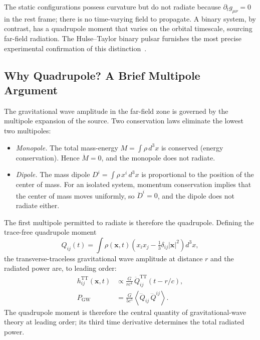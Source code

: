 \documentclass[%
 reprint, amsmath,amssymb, aps, prd, ]{revtex4-2}
\numberwithin{equation}{section}
\begin{document}
The static configurations possess curvature but do not radiate because $\partial_t g_{\mu\nu} = 0$ in the rest frame; there is no time-varying field to propagate.
A binary system, by contrast, has a quadrupole moment that varies on the orbital timescale, sourcing far-field radiation.
The Hulse--Taylor binary pulsar furnishes the most precise experimental confirmation of this distinction~\cite{Hartle2003, Peters1963}.

\subsection{Why Quadrupole? A Brief Multipole Argument}

The gravitational wave amplitude in the far-field zone is governed by the multipole expansion of the source.
Two conservation laws eliminate the lowest two multipoles:
\begin{itemize}[leftmargin=2em, itemsep=4pt]
\item \emph{Monopole.} The total mass-energy $M = \int \rho \, d^3x$ is conserved (energy conservation). Hence $\ddot{M} = 0$, and the monopole does not radiate.
\item \emph{Dipole.} The mass dipole $D^i = \int \rho\, x^i\, d^3x$ is proportional to the position of the center of mass. For an isolated system, momentum conservation implies that the center of mass moves uniformly, so $\ddot{D}^i = 0$, and the dipole does not radiate either.
\end{itemize}
The first multipole permitted to radiate is therefore the quadrupole.
Defining the trace-free quadrupole moment
\begin{equation}
Q_{ij}(t) = \int \rho(\bm{x}, t)\!\left(x_i x_j - \tfrac{1}{3}\delta_{ij}|\bm{x}|^2\right) d^3x,
\label{eq:Q_def_appB}
\end{equation}
the transverse-traceless gravitational wave amplitude at distance $r$ and the radiated power are, to leading order:
\begin{align}
h_{ij}^{\mathrm{TT}}(\bm{x}, t) &\propto \frac{G}{r c^4}\, \ddot{Q}_{ij}^{\mathrm{TT}}\!\left(t - r/c\right),
\label{eq:h_quadrupole_appB}\\
P_{\mathrm{GW}} &= \frac{G}{5 c^5}\!\left\langle \dddot{Q}_{ij}\, \dddot{Q}^{ij} \right\rangle.
\label{eq:P_quadrupole_appB}
\end{align}
The quadrupole moment is therefore the central quantity of gravitational-wave theory at leading order; its third time derivative determines the total radiated power.
\end{document}
